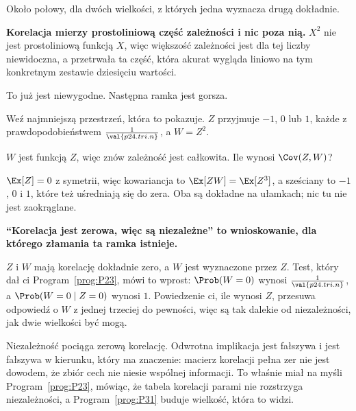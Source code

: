 \begin{fr}

Około połowy, dla dwóch wielkości, z których jedna wyznacza drugą dokładnie.

\textbf{Korelacja mierzy prostoliniową część zależności i nic poza nią.}
$X^{2}$ nie jest prostoliniową funkcją $X$, więc większość zależności jest dla
tej liczby niewidoczna, a przetrwała ta część, która akurat wygląda liniowo na
tym konkretnym zestawie dziesięciu wartości.

To już jest niewygodne. Następna ramka jest gorsza.
\end{fr}

\begin{fr}
Weź najmniejszą przestrzeń, która to pokazuje. $Z$ przyjmuje $-1$, $0$ lub
$1$, każde z prawdopodobieństwem $\frac{1}{\val{p24.tri.n}}$, a $W = Z^{2}$.

$W$ jest funkcją $Z$, więc znów zależność jest całkowita. Ile wynosi
$\Cov(Z, W)$?
\dotline
\nextframe
\end{fr}

\begin{fr}

$\Ex[Z] = 0$ z symetrii, więc kowariancja to $\Ex[ZW] = \Ex[Z^{3}]$, a
sześciany to $-1$, $0$ i $1$, które też uśredniają się do zera. Oba są
dokładne na ułamkach; nic tu nie jest zaokrąglane.

\begin{trapbox}
\textbf{\enquote{Korelacja jest zerowa, więc są niezależne} to wnioskowanie,
dla którego złamania ta ramka istnieje.}

$Z$ i $W$ mają korelację dokładnie zero, a $W$ jest wyznaczone przez $Z$. Test,
który dał ci Program~\ref{prog:P23}, mówi to wprost: $\Prob(W = 0)$ wynosi
$\frac{1}{\val{p24.tri.n}}$, a $\Prob(W = 0 \mid Z = 0)$ wynosi $1$.
Powiedzenie ci, ile wynosi $Z$, przesuwa odpowiedź o $W$ z jednej trzeciej do
pewności, więc są tak dalekie od niezależności, jak dwie wielkości być mogą.

Niezależność pociąga zerową korelację. Odwrotna implikacja jest fałszywa i
jest fałszywa w kierunku, który ma znaczenie: macierz korelacji pełna zer nie
jest dowodem, że zbiór cech nie niesie wspólnej informacji. To właśnie miał na
myśli Program~\ref{prog:P23}, mówiąc, że tabela korelacji parami nie
rozstrzyga niezależności, a Program~\ref{prog:P31} buduje wielkość, która to
widzi.
\end{trapbox}
\end{fr}

